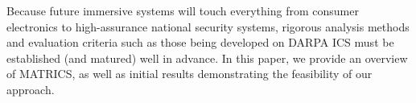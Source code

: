 Because future immersive systems will touch everything from consumer electronics to high-assurance national security systems, rigorous analysis methods and evaluation criteria such as those being developed on DARPA ICS must be established (and matured) well in advance. In this paper, we provide an overview of MATRICS, as well as initial results demonstrating the feasibility of our approach.

